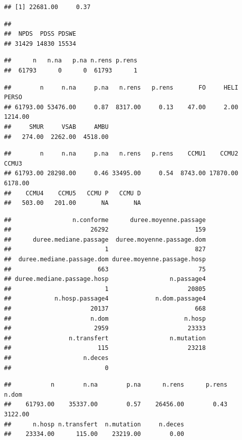 \documentclass[]{article}
\begin{document}
\begin{verbatim}
## [1] 22681.00     0.37
\end{verbatim}

\begin{verbatim}
## 
##  NPDS  PDSS PDSWE 
## 31429 14830 15534
\end{verbatim}

\begin{verbatim}
##      n   n.na   p.na n.rens p.rens 
##  61793      0      0  61793      1
\end{verbatim}

\begin{verbatim}
##        n     n.na     p.na   n.rens   p.rens       FO     HELI    PERSO 
## 61793.00 53476.00     0.87  8317.00     0.13    47.00     2.00  1214.00 
##     SMUR     VSAB     AMBU 
##   274.00  2262.00  4518.00
\end{verbatim}

\begin{verbatim}
##        n     n.na     p.na   n.rens   p.rens    CCMU1    CCMU2    CCMU3 
## 61793.00 28298.00     0.46 33495.00     0.54  8743.00 17870.00  6178.00 
##    CCMU4    CCMU5   CCMU P   CCMU D 
##   503.00   201.00       NA       NA
\end{verbatim}

\begin{verbatim}
##                 n.conforme      duree.moyenne.passage 
##                      26292                        159 
##      duree.mediane.passage  duree.moyenne.passage.dom 
##                          1                        827 
##  duree.mediane.passage.dom duree.moyenne.passage.hosp 
##                        663                         75 
## duree.mediane.passage.hosp                 n.passage4 
##                          1                      20805 
##            n.hosp.passage4             n.dom.passage4 
##                      20137                        668 
##                      n.dom                     n.hosp 
##                       2959                      23333 
##                n.transfert                 n.mutation 
##                        115                      23218 
##                    n.deces 
##                          0
\end{verbatim}

\begin{verbatim}
##           n        n.na        p.na      n.rens      p.rens       n.dom 
##    61793.00    35337.00        0.57    26456.00        0.43     3122.00 
##      n.hosp n.transfert  n.mutation     n.deces 
##    23334.00      115.00    23219.00        0.00
\end{verbatim}
\end{document}
